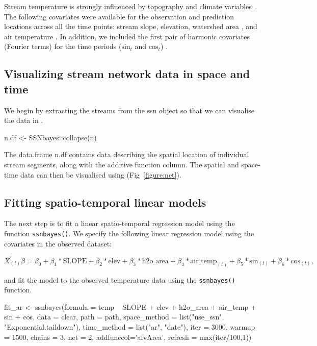 Stream temperature is strongly influenced by topography and climate variables \citep{isaak2017norwest}. The following covariates were available for the observation and prediction locations across all the time points: stream slope, elevation, watershed area \citep{isaak2017norwest}, and air temperature \citep[e.g.][]{bal2014hierarchical}. In addition, we included the first pair of harmonic covariates (Fourier terms) for the time periods  ($\textrm{sin}_t$ and $\textrm{cos}_t$) \citep{forecast}.


\subsection{Visualizing stream network data in space and time}



We begin by extracting the streams from the ssn object so that we can visualise the data in . 

\begin{example}
n.df <- SSNbayes::collapse(n)
\end{example}

\noindent The data.frame n.df contains data describing the spatial location of individual stream segments, along with the additive function column. The spatial and space-time data can then be visualised using  (Fig~\ref{figure:net}). 


\subsection{Fitting spatio-temporal linear models}

The next step is to fit a linear spatio-temporal regression model using the function \texttt{ssnbayes()}. We specify the following linear regression model using the covariates in the observed dataset: 

\begin{equation}
X_{(t)}^{'}\beta = \beta_0 + \beta_1 * \textrm{SLOPE} + \beta_2 * \textrm{elev}  + \beta_3 * \textrm{h2o\_area} + \beta_4 * \textrm{air\_temp}_{(t)} +  \beta_5 * \textrm{sin}_{(t)} + \beta_6 * \textrm{cos}_{(t)}, 
\label{eq:lin}
\end{equation}

\noindent and fit the model to the observed temperature data using the \texttt{ssnbayes()} function. 

\begin{example}
fit_ar <- ssnbayes(formula = temp ~ SLOPE + elev + h2o_area + air_temp + sin + cos, 
                   data = clear,
                   path = path,
                   space_method = list("use_ssn", "Exponential.taildown"),
                   time_method = list("ar", "date"),
                   iter = 3000,
                   warmup = 1500,
                   chains = 3,
                   net = 2, 
                   addfunccol='afvArea',
                   refresh = max(iter/100,1))
\end{example}

